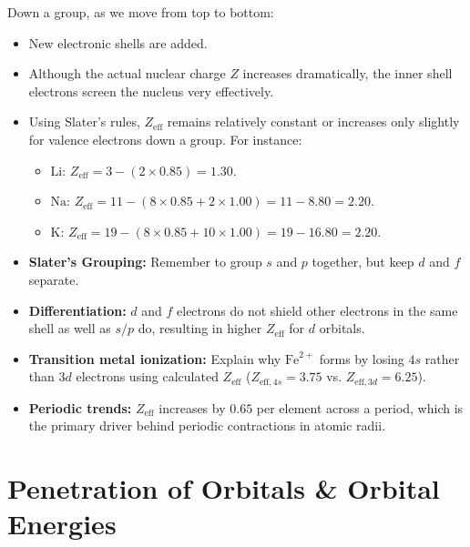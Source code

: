 \documentclass[12pt,a4paper]{article}
\begin{document}
Down a group, as we move from top to bottom:
\begin{itemize}[leftmargin=*, itemsep=2pt]
  \item New electronic shells are added.
  \item Although the actual nuclear charge $Z$ increases dramatically, the inner shell electrons screen the nucleus very effectively.
  \item Using Slater's rules, $Z_{\text{eff}}$ remains relatively constant or increases only slightly for valence electrons down a group. For instance:
    \begin{itemize}
      \item $\text{Li}$: $Z_{\text{eff}} = 3 - (2 \times 0.85) = 1.30$.
      \item $\text{Na}$: $Z_{\text{eff}} = 11 - (8 \times 0.85 + 2 \times 1.00) = 11 - 8.80 = 2.20$.
      \item $\text{K}$: $Z_{\text{eff}} = 19 - (8 \times 0.85 + 10 \times 1.00) = 19 - 16.80 = 2.20$.
    \end{itemize}
\end{itemize}

\begin{tcolorbox}[exambox, title={Exam Points: Effective Nuclear Charge}]
  \begin{itemize}[leftmargin=*, itemsep=2pt, topsep=2pt]
    \item \textbf{Slater's Grouping:} Remember to group $s$ and $p$ together, but keep $d$ and $f$ separate.
    \item \textbf{Differentiation:} $d$ and $f$ electrons do not shield other electrons in the same shell as well as $s/p$ do, resulting in higher $Z_{\text{eff}}$ for $d$ orbitals.
    \item \textbf{Transition metal ionization:} Explain why $\text{Fe}^{2+}$ forms by losing $4s$ rather than $3d$ electrons using calculated $Z_{\text{eff}}$ ($Z_{\text{eff}, 4s} = 3.75$ vs. $Z_{\text{eff}, 3d} = 6.25$).
    \item \textbf{Periodic trends:} $Z_{\text{eff}}$ increases by $0.65$ per element across a period, which is the primary driver behind periodic contractions in atomic radii.
  \end{itemize}
\end{tcolorbox}

\section{Penetration of Orbitals \& Orbital Energies}
\end{document}
